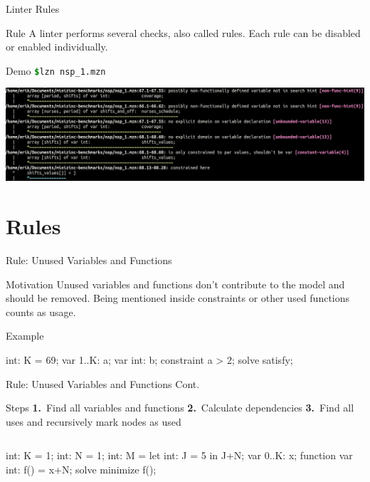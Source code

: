 \documentclass[aspectratio=169]{beamer} %
\begin{document}
\begin{frame}{Linter Rules}
  \begin{block}{Rule}
    A linter performs several checks, also called rules.
    Each rule can be disabled or enabled individually.
  \end{block}
\end{frame}

\begin{frame}{Demo}
  \texttt{\textcolor{green}{\bfseries\$}\;lzn nsp\_1.mzn}\bigskip\pause

  \includegraphics[width=\textwidth]{lznexample.png}
\end{frame}

\section{Rules}

\begin{frame}[fragile]{Rule: Unused Variables and Functions}
  \begin{block}{Motivation}
    Unused variables and functions don't contribute to the model and should be removed.\pause{}
    Being mentioned inside constraints or other used functions counts as usage.
  \end{block}

  \pause
  \begin{exampleblock}{Example}
  \begin{mznno}
int: K = 69;
var 1..K: a;      %
var int: b;       %
constraint a > 2; %
solve satisfy;
  \end{mznno}
  \end{exampleblock}
\end{frame}

\begin{frame}[fragile]{Rule: Unused Variables and Functions Cont.}
  \begin{block}{Steps}
    \textbf{1.}~Find all variables and functions\quad
    \textbf{2.}~Calculate dependencies\quad
    \textbf{3.}~Find all uses and recursively mark nodes as used\quad
  \end{block}

  \pause
  \begin{columns}[onlytextwidth]
    \begin{mznno}
int: K = 1;
int: N = 1;
int: M = let {int: J = 5} in J+N;
var 0..K: x;
function var int: f() = x+N;
solve minimize f();
    \end{mznno}
    \pause
    
  \end{columns}
\end{frame}
\end{document}
